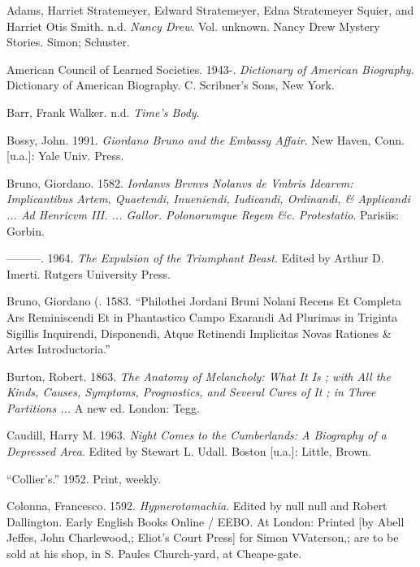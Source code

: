 \documentclass[
]{article}
\newlength{\cslhangindent}
\newenvironment{CSLReferences}[2] %
 {\begin{list}{}{%
  \setlength{\itemindent}{0pt}
  \setlength{\leftmargin}{0pt}
  \setlength{\parsep}{0pt}
  \ifodd #1
   \setlength{\leftmargin}{\cslhangindent}
   \setlength{\itemindent}{-1\cslhangindent}
  \fi
  \setlength{\itemsep}{#2\baselineskip}}}
 {\end{list}}
\begin{document}
\label{refs}
\begin{CSLReferences}{1}{0}
Adams, Harriet Stratemeyer, Edward Stratemeyer, Edna Stratemeyer Squier,
and Harriet Otis Smith. n.d. \emph{Nancy Drew}. Vol. unknown. Nancy Drew
Mystery Stories. Simon; Schuster.

American Council of Learned Societies. 1943-. \emph{Dictionary of
American Biography}. Dictionary of American Biography. C. Scribner's
Sons, New York.

Barr, Frank Walker. n.d. \emph{Time's Body}.

Bossy, John. 1991. \emph{Giordano Bruno and the Embassy Affair}. New
Haven, Conn. {[}u.a.{]}: Yale Univ. Press.

Bruno, Giordano. 1582. \emph{Iordanvs Brvnvs Nolanvs de Vmbris Idearvm:
Implicantibus Artem, Quaetendi, Inueniendi, Iudicandi, Ordinandi, \&
Applicandi ... Ad Henricvm III. ... Gallor. Polonorumque Regem \&c.
Protestatio}. Parisiis: Gorbin.

---------. 1964. \emph{The Expulsion of the Triumphant Beast}. Edited by
Arthur D. Imerti. Rutgers University Press.

Bruno, Giordano (. 1583. {``Philothei Jordani Bruni Nolani Recens Et
Completa Ars Reminiscendi Et in Phantastico Campo Exarandi Ad Plurimas
in Triginta Sigillis Inquirendi, Disponendi, Atque Retinendi Implicitas
Novas Rationes \& Artes Introductoria.''}

Burton, Robert. 1863. \emph{The Anatomy of Melancholy: What It Is ; with
All the Kinds, Causes, Symptoms, Prognostics, and Several Cures of It ;
in Three Partitions ...} A new ed. London: Tegg.

Caudill, Harry M. 1963. \emph{Night Comes to the Cumberlands: A
Biography of a Depressed Area}. Edited by Stewart L. Udall. Boston
{[}u.a.{]}: Little, Brown.

{``Collier's.''} 1952. Print, weekly.

Colonna, Francesco. 1592. \emph{Hypnerotomachia}. Edited by null null
and Robert Dallington. Early English Books Online / EEBO. At London:
Printed {[}by Abell Jeffes, John Charlewood,; Eliot's Court Press{]} for
Simon VVaterson,; are to be sold at his shop, in S. Paules Church-yard,
at Cheape-gate.


\end{CSLReferences}
\end{document}
